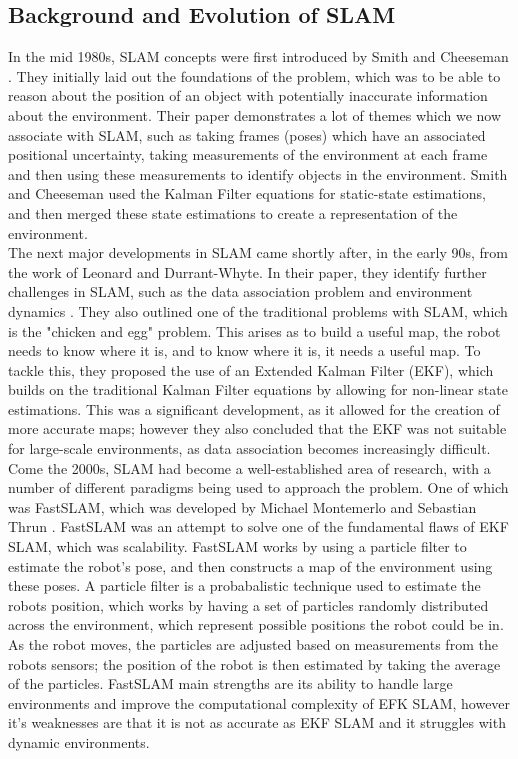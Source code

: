\documentclass[12pt]{article}
\begin{document}
\subsection{Background and Evolution of SLAM} %
In the mid 1980s, SLAM concepts were first introduced by Smith and Cheeseman \cite{Early_SLAM}. They initially laid out
the foundations of the problem, which was to be able to reason about the position of an object with potentially inaccurate
information about the environment. Their paper demonstrates a lot of themes which we now associate with SLAM, such as taking
frames (poses) which have an associated positional uncertainty, taking measurements of the environment at each frame and
then using these measurements to identify objects in the environment. Smith and Cheeseman used the Kalman Filter equations
for static-state estimations, and then merged these state estimations to create a representation of the environment.\\
The next major developments in SLAM came shortly after, in the early 90s, from the work of Leonard and Durrant-Whyte.
In their paper, they identify further challenges in SLAM, such as the data association problem and environment dynamics \cite{First_EKF}.
They also outlined one of the traditional problems with SLAM, which is the "chicken and egg" problem. This arises as
to build a useful map, the robot needs to know where it is, and to know where it is, it needs a useful map. To tackle
this, they proposed the use of an Extended Kalman Filter (EKF), which builds on the traditional Kalman Filter equations by
allowing for non-linear state estimations. This was a significant development, as it allowed for the creation of more accurate
maps; however they also concluded that the EKF was not suitable for large-scale environments, as data association becomes
increasingly difficult.\\
Come the 2000s, SLAM had become a well-established area of research, with a number of different paradigms being used to
approach the problem. One of which was FastSLAM, which was developed by Michael Montemerlo and Sebastian Thrun \cite{FastSLAM}.
FastSLAM was an attempt to solve one of the fundamental flaws of EKF SLAM, which was scalability. FastSLAM works by using
a particle filter to estimate the robot's pose, and then constructs a map of the environment using these poses. A particle filter is
a probabalistic technique used to estimate the robots position, which works by having a set of particles randomly distributed
across the environment, which represent possible positions the robot could be in. As the robot moves, the particles are adjusted
based on measurements from the robots sensors; the position of the robot is then estimated by taking the average of the particles.
FastSLAM main strengths are its ability to handle large environments and improve the computational complexity of EFK SLAM, however
it's weaknesses are that it is not as accurate as EKF SLAM and it struggles with dynamic environments.\\
\end{document}
